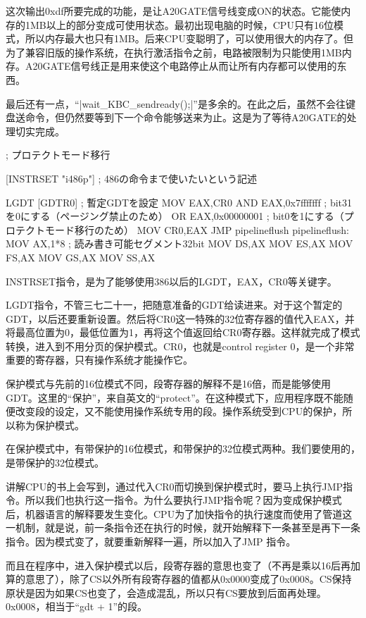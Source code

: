 这次输出0xdf所要完成的功能，是让A20GATE信号线变成ON的状态。它能使内存的1MB以上的部分变成可使用状态。最初出现电脑的时候，CPU只有16位模式，所以内存最大也只有1MB。后来CPU变聪明了，可以使用很大的内存了。但为了兼容旧版的操作系统，在执行激活指令之前，电路被限制为只能使用1MB内存。A20GATE信号线正是用来使这个电路停止从而让所有内存都可以使用的东西。

最后还有一点，“|wait_KBC_sendready();|”是多余的。在此之后，虽然不会往键盘送命令，但仍然要等到下一个命令能够送来为止。这是为了等待A20GATE的处理切实完成。

\cs

\begin{code}[label=asmhead.nas节选 (续)]
; プロテクトモード移行

[INSTRSET "i486p"]				; 486の命令まで使いたいという記述

		LGDT	[GDTR0]			; 暫定GDTを設定
		MOV		EAX,CR0
		AND		EAX,0x7fffffff	; bit31を0にする（ページング禁止のため）
		OR		EAX,0x00000001	; bit0を1にする（プロテクトモード移行のため）
		MOV		CR0,EAX
		JMP		pipelineflush
pipelineflush:
		MOV		AX,1*8			;  読み書き可能セグメント32bit
		MOV		DS,AX
		MOV		ES,AX
		MOV		FS,AX
		MOV		GS,AX
		MOV		SS,AX
\end{code}

INSTRSET指令，是为了能够使用386以后的LGDT，EAX，CR0等关键字。

LGDT指令，不管三七二十一，把随意准备的GDT给读进来。对于这个暂定的GDT，以后还要重新设置。然后将CR0这一特殊的32位寄存器的值代入EAX，并将最高位置为0，最低位置为1，再将这个值返回给CR0寄存器。这样就完成了模式转换，进入到不用分页的保护模式。CR0，也就是control register 0，是一个非常重要的寄存器，只有操作系统才能操作它。

保护模式与先前的16位模式不同，段寄存器的解释不是16倍，而是能够使用GDT。这里的“保护”，来自英文的“protect”。在这种模式下，应用程序既不能随便改变段的设定，又不能使用操作系统专用的段。操作系统受到CPU的保护，所以称为保护模式。

在保护模式中，有带保护的16位模式，和带保护的32位模式两种。我们要使用的，是带保护的32位模式。

讲解CPU的书上会写到，通过代入CR0而切换到保护模式时，要马上执行JMP指令。所以我们也执行这一指令。为什么要执行JMP指令呢？因为变成保护模式后，机器语言的解释要发生变化。CPU为了加快指令的执行速度而使用了管道这一机制，就是说，前一条指令还在执行的时候，就开始解释下一条甚至是再下一条指令。因为模式变了，就要重新解释一遍，所以加入了JMP 指令。

而且在程序中，进入保护模式以后，段寄存器的意思也变了（不再是乘以16后再加算的意思了），除了CS以外所有段寄存器的值都从0x0000变成了0x0008。CS保持原状是因为如果CS也变了，会造成混乱，所以只有CS要放到后面再处理。0x0008，相当于“gdt + 1”的段。

